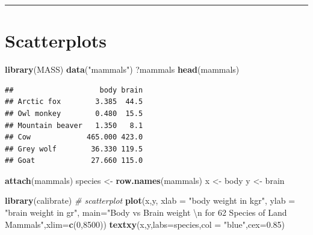\documentclass[]{book}
\newenvironment{Shaded}{\begin{snugshade}}{\end{snugshade}}
\newcommand{\KeywordTok}[1]{\textcolor[rgb]{0.13,0.29,0.53}{\textbf{#1}}}
\newcommand{\DataTypeTok}[1]{\textcolor[rgb]{0.13,0.29,0.53}{#1}}
\newcommand{\DecValTok}[1]{\textcolor[rgb]{0.00,0.00,0.81}{#1}}
\newcommand{\FloatTok}[1]{\textcolor[rgb]{0.00,0.00,0.81}{#1}}
\newcommand{\CharTok}[1]{\textcolor[rgb]{0.31,0.60,0.02}{#1}}
\newcommand{\StringTok}[1]{\textcolor[rgb]{0.31,0.60,0.02}{#1}}
\newcommand{\CommentTok}[1]{\textcolor[rgb]{0.56,0.35,0.01}{\textit{#1}}}
\newcommand{\NormalTok}[1]{#1}
\begin{document}
\begin{center}\rule{0.5\linewidth}{\linethickness}\end{center}

\section{Scatterplots}\label{scatterplots}

\begin{Shaded}
\begin{Highlighting}[]
\KeywordTok{library}\NormalTok{(MASS)}
\KeywordTok{data}\NormalTok{(}\StringTok{"mammals"}\NormalTok{)}
\NormalTok{?mammals}
\KeywordTok{head}\NormalTok{(mammals)}
\end{Highlighting}
\end{Shaded}

\begin{verbatim}
##                    body brain
## Arctic fox        3.385  44.5
## Owl monkey        0.480  15.5
## Mountain beaver   1.350   8.1
## Cow             465.000 423.0
## Grey wolf        36.330 119.5
## Goat             27.660 115.0
\end{verbatim}

\begin{Shaded}
\begin{Highlighting}[]
\KeywordTok{attach}\NormalTok{(mammals)}
\NormalTok{species <-}\StringTok{ }\KeywordTok{row.names}\NormalTok{(mammals)}
\NormalTok{x <-}\StringTok{ }\NormalTok{body}
\NormalTok{y <-}\StringTok{ }\NormalTok{brain}
\end{Highlighting}
\end{Shaded}

\begin{Shaded}
\begin{Highlighting}[]
\KeywordTok{library}\NormalTok{(calibrate)}
\CommentTok{# scatterplot}
\KeywordTok{plot}\NormalTok{(x,y, }\DataTypeTok{xlab =} \StringTok{"body weight in kgr"}\NormalTok{, }\DataTypeTok{ylab =} \StringTok{"brain weight in gr"}\NormalTok{, }
     \DataTypeTok{main=}\StringTok{"Body vs Brain weight }\CharTok{\textbackslash{}n}\StringTok{ for 62 Species of Land Mammals"}\NormalTok{,}\DataTypeTok{xlim=}\KeywordTok{c}\NormalTok{(}\DecValTok{0}\NormalTok{,}\DecValTok{8500}\NormalTok{))}
\KeywordTok{textxy}\NormalTok{(x,y,}\DataTypeTok{labs=}\NormalTok{species,}\DataTypeTok{col =} \StringTok{"blue"}\NormalTok{,}\DataTypeTok{cex=}\FloatTok{0.85}\NormalTok{) }
\end{Highlighting}
\end{Shaded}
\end{document}
